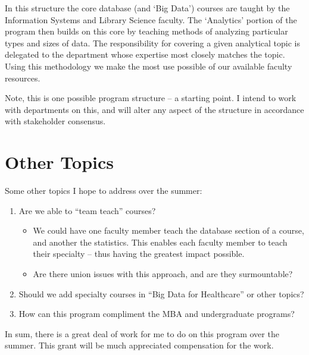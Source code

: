 \documentclass[12pt]{article}
\begin{document}
In this structure the core database (and `Big Data') courses are taught by the Information Systems and Library Science faculty.  The `Analytics' portion of the program then builds on this core by teaching methods of analyzing particular types and sizes of data. The responsibility for covering a given analytical topic is delegated to the department whose expertise most closely matches the topic.  Using this methodology we make the most use possible of our available faculty resources.

Note, this is one possible program structure -- a starting point.  I intend to work with departments on this, and will alter any aspect of the structure in accordance with stakeholder consensus.

\section{Other Topics}

Some other topics I hope to address over the summer:

\begin{enumerate}
\item Are we able to ``team teach'' courses?  
  \begin{itemize}
  \item We could have one faculty member teach the database section of a course, and another the statistics.  This enables each faculty member to teach their specialty -- thus having the greatest impact possible.
  \item Are there union issues with this approach, and are they surmountable?
  \end{itemize}
\item Should we add specialty courses in ``Big Data for Healthcare'' or other topics?  
\item How can this program compliment the MBA and undergraduate programs?
\end{enumerate}

In sum, there is a great deal of work for me to do on this program over the summer.  This grant will be much appreciated compensation for the work.
\end{document}

